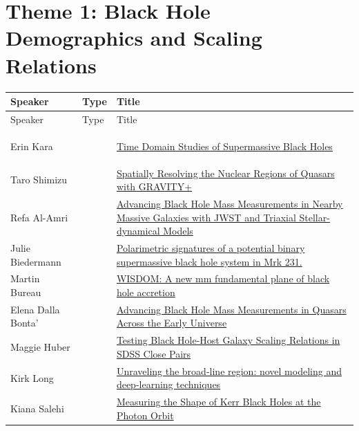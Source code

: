 \hypertarget{sched-day-monday}{}

\hypertarget{sched-monday-1}{}
\section*{Theme 1: Black Hole Demographics and Scaling Relations}

{
\small
{}
\sloppy
\setlength{\emergencystretch}{1em}
\begin{longtable}{@{}>{\TableRaggedRight\arraybackslash\hspace{0pt}}p{} >{\centering\arraybackslash}p{} >{\TableRaggedRight\arraybackslash\hspace{0pt}}p{}@{}}
\toprule
Speaker & Type & Title \\
\midrule
\endfirsthead
\toprule
Speaker & Type & Title \\
\midrule
\endhead
\hypertarget{sched-8}{}Erin Kara & \invitedbadge{} & \hyperlink{abs-8}{Time Domain Studies of Supermassive Black Holes} \\
\hypertarget{sched-9}{}Taro Shimizu & \invitedbadge{} & \hyperlink{abs-9}{Spatially Resolving the Nuclear Regions of Quasars with GRAVITY+} \\
\hypertarget{sched-14}{}Refa Al-Amri &  & \hyperlink{abs-14}{Advancing Black Hole Mass Measurements in Nearby Massive Galaxies with JWST and Triaxial Stellar-dynamical Models} \\
\hypertarget{sched-15}{}Julie Biedermann &  & \hyperlink{abs-15}{Polarimetric signatures of a potential binary supermassive black hole system in Mrk 231.} \\
\hypertarget{sched-16}{}Martin Bureau &  & \hyperlink{abs-16}{WISDOM: A new mm fundamental plane of black hole accretion} \\
\hypertarget{sched-17}{}Elena Dalla Bonta' &  & \hyperlink{abs-17}{Advancing Black Hole Mass Measurements in Quasars Across the Early Universe} \\
\hypertarget{sched-18}{}Maggie Huber &  & \hyperlink{abs-18}{Testing Black Hole-Host Galaxy Scaling Relations in SDSS Close Pairs} \\
\hypertarget{sched-19}{}Kirk Long &  & \hyperlink{abs-19}{Unraveling the broad-line region: novel modeling and deep-learning techniques} \\
\hypertarget{sched-20}{}Kiana Salehi &  & \hyperlink{abs-20}{Measuring the Shape of Kerr Black Holes at the Photon Orbit} \\

\end{longtable}}
